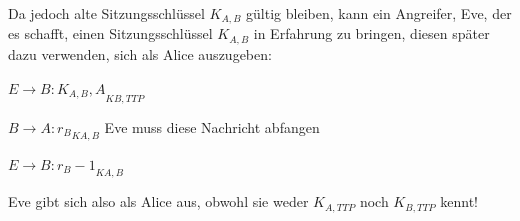 \documentclass[a4paper]{article}
\begin{document}
\begin{multicols}{3}
\begin{itemize*}
\begin{itemize*}
                  \item Da jedoch alte Sitzungsschlüssel $K_{A,B}$ gültig bleiben, kann ein Angreifer, Eve, der es schafft, einen Sitzungsschlüssel $K_{A,B}$ in Erfahrung zu bringen, diesen später dazu verwenden, sich als Alice auszugeben:
                  \begin{enumerate*}
                        \item $E\rightarrow B:{K_{A,B}, A}_{{K}{B,TTP}}$
                        \item $B\rightarrow A:{r_B}_{{K}{A,B}}$ Eve muss diese Nachricht abfangen
                        \item $E\rightarrow B:{r_B -1}_{{K}{A,B}}$
                  \end{enumerate*}
                  \begin{itemize*}
                        \item Eve gibt sich also als Alice aus, obwohl sie weder $K_{A,TTP}$ noch $K_{B,TTP}$ kennt!
                  \end{itemize*}
            \end{itemize*}
      \end{itemize*}


\end{multicols}
\end{document}
